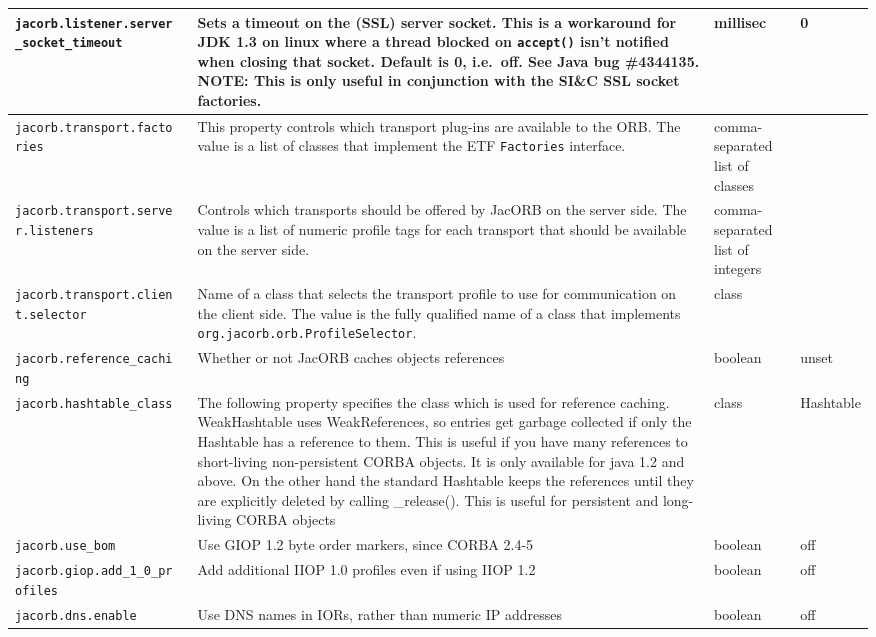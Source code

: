 {{\begin{small}
\begin{longtable}{|p{5cm}|p{7.5cm}|p{1.5cm}|p{1.5cm}|}
\verb"jacorb.listener.server"
\verb"_socket_timeout" & Sets a timeout on the (SSL) server socket. This is a
workaround for JDK 1.3 on linux where a thread blocked on \verb"accept()"
isn't notified when closing that socket. Default is 0, i.e.~off. See Java bug
\#4344135. NOTE: This is only useful in conjunction with the SI\&C SSL socket
factories. & millisec & 0\\
\hline

\verb"jacorb.transport.facto"
\verb"ries" & This property controls which transport plug-ins are
available to the ORB.  The value is a list of classes that implement the ETF
{\tt Factories} interface.
& comma-separated list of classes & \\
\hline
\verb"jacorb.transport.serve"
\verb"r.listeners" & Controls which transports should be offered by
JacORB on the server side.  The value is a list of numeric profile
tags for each transport that should be available on the server side.
& comma-separated list of integers & \\
\hline
\verb"jacorb.transport.clien"
\verb"t.selector" & Name of a class that selects the transport profile
to use for communication on the client side.  The value is the fully
qualified name of a class that implements {\tt
  org.jacorb.orb.ProfileSelector}.
& class & \\
\hline
\verb"jacorb.reference_cachi"
\verb"ng" & Whether or not JacORB caches objects references & boolean & unset  \\
\hline
\verb"jacorb.hashtable_class" & The following property specifies the
class which is used for reference caching. WeakHashtable uses
WeakReferences, so entries get garbage collected if only the Hashtable
has a reference to them. This is useful if you have many references to
short-living non-persistent CORBA objects. It is only available for
java 1.2 and above. On the other hand the standard Hashtable keeps the
references until they are explicitly deleted by calling
\_release(). This is useful for persistent and long-living CORBA
objects & class & Hashtable \\
\hline
\verb"jacorb.use_bom" & Use GIOP 1.2 byte order markers, since CORBA
2.4-5 & boolean & off  \\
\hline
\verb"jacorb.giop.add_1_0_pr"
\verb"ofiles" & Add additional IIOP 1.0 profiles even if using IIOP
1.2 & boolean & off \\
\hline
\verb"jacorb.dns.enable" & Use DNS names in IORs, rather than numeric
IP addresses & boolean & off \\
\hline

\end{longtable}
\end{small}}}
